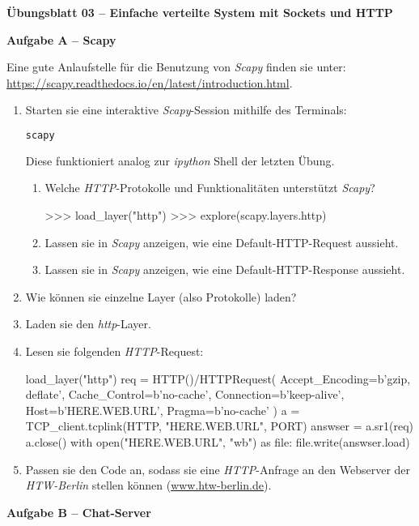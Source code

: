 \documentclass[paper=a4,fontsize=11pt]{scrartcl}%
\numberwithin{equation}{section}
\begin{document}
\begin{center}
\Large{\textbf{Übungsblatt 03 -- Einfache verteilte System mit Sockets und HTTP}}
\end{center}

\begin{center}\Large{\textbf{Aufgabe A -- Scapy}}\end{center}\vskip0.25in
Eine gute Anlaufstelle für die Benutzung von \emph{Scapy} finden sie unter: \url{https://scapy.readthedocs.io/en/latest/introduction.html}.
\begin{enumerate}
	\item Starten sie eine interaktive \emph{Scapy}-Session mithilfe des Terminals:
	\begin{lstlisting}[style=Bash, language=Bash]
scapy
	\end{lstlisting}
	Diese funktioniert analog zur \emph{ipython} Shell der letzten Übung.
	\begin{enumerate}
		\item Welche \emph{HTTP}-Protokolle und Funktionalitäten unterstützt \emph{Scapy}?
		\begin{python}
>>> load_layer("http")
>>> explore(scapy.layers.http)
		\end{python}
		\item Lassen sie in \emph{Scapy} anzeigen, wie eine Default-HTTP-Request aussieht.
		\item Lassen sie in \emph{Scapy} anzeigen, wie eine Default-HTTP-Response aussieht.
	\end{enumerate}		
	\item Wie können sie einzelne Layer (also Protokolle) laden?
	\item Laden sie den \emph{http}-Layer.
	\item Lesen sie folgenden \emph{HTTP}-Request:
	\begin{python}
load_layer("http")
req = HTTP()/HTTPRequest(
    Accept_Encoding=b'gzip, deflate',
    Cache_Control=b'no-cache',
    Connection=b'keep-alive',
    Host=b'HERE.WEB.URL',
    Pragma=b'no-cache'
)
a = TCP_client.tcplink(HTTP, "HERE.WEB.URL", PORT)
answser = a.sr1(req)
a.close()
with open("HERE.WEB.URL", "wb") as file:
    file.write(answser.load)
\end{python}
	\item Passen sie den Code an, sodass sie eine \emph{HTTP}-Anfrage an den Webserver der \emph{HTW-Berlin} stellen können (\url{www.htw-berlin.de}).
\end{enumerate}

\begin{center}\Large{\textbf{Aufgabe B -- Chat-Server}}\end{center}\vskip0.25in
\end{document}
